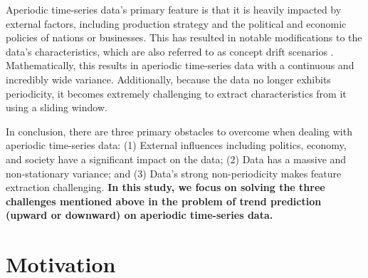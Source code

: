 Aperiodic time-series data's primary feature is that it is heavily impacted by external factors, including production strategy and the political and economic policies of nations or businesses. This has resulted in notable modifications to the data's characteristics, which are also referred to as concept drift scenarios \cite{liu2025onsitnet}. Mathematically, this results in aperiodic time-series data with a continuous and incredibly wide variance. Additionally, because the data no longer exhibits periodicity, it becomes extremely challenging to extract characteristics from it using a sliding window.


In conclusion, there are three primary obstacles to overcome when dealing with aperiodic time-series data: (1) External influences including politics, economy, and society have a significant impact on the data; (2) Data has a massive and non-stationary variance; and (3) Data's strong non-periodicity makes feature extraction challenging. \textbf{In this study, we focus on solving the three challenges mentioned above in the problem of trend prediction (upward or downward) on aperiodic time-series data.}

\section{Motivation}
\label{sec:moti}


